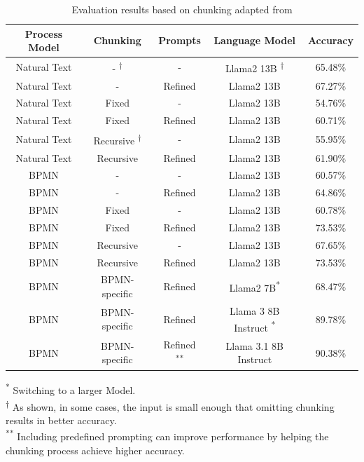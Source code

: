 \documentclass[%
    paper=A4,                    %
    twoside=true,               %
    openright,                  %
    parskip=full,               %
    chapterprefix=true,         %
    11pt,                       %
    headings=normal,            %
    bibliography=totoc,         %
    listof=totoc,              %
    titlepage=on,              %
    captions=tableabove,        %
    draft=false,               %
]{scrreprt}%
\begin{document}
     \begin{table}[H]
   	\centering
   	\begin{tabular}{|c|c|c|c| c|}
   		\hline
   		\rowcolor{blue!30}
   		Process Model & Chunking & Prompts & Language Model & Accuracy \\
   		\hline
   		Natural Text & - \textsuperscript{†}& - & Llama2 13B \textsuperscript{†} & \cellcolor{yellow!30}65.48\% \\
   		Natural Text & - & Refined 	 & Llama2 13B & 67.27\% \\
   		Natural Text & Fixed & - & Llama2 13B & 54.76\% \\
   		Natural Text & Fixed & Refined & Llama2 13B & 60.71\% \\
   		Natural Text & Recursive  \textsuperscript{†}& - & Llama2 13B &\cellcolor{yellow!30} 55.95\% \\
   		Natural Text & Recursive & Refined & Llama2 13B & 61.90\% \\
   		BPMN & - & - & Llama2 13B & 60.57\% \\
   		BPMN & - & Refined & Llama2 13B & 64.86\% \\
   		BPMN & Fixed & - & Llama2 13B & 60.78\% \\
   		BPMN & Fixed & Refined & Llama2 13B & 73.53\% \\
   		BPMN & Recursive & - & Llama2 13B & 67.65\% \\
   		BPMN & Recursive & Refined & Llama2 13B & 73.53\% \\
   		BPMN & BPMN-specific & Refined & Llama2 7B\textsuperscript{{\hypertarget{model}{*}}} & 68.47\% \\
   		BPMN & BPMN-specific & Refined & Llama 3 8B Instruct \textsuperscript{*} & 89.78\% \\
   		
   		BPMN & BPMN-specific & Refined  \textsuperscript{**}&  Llama 3.1 8B Instruct  & 90.38\% \\
   		\bottomrule
   	\end{tabular}
   	
   	\caption{Evaluation results based on chunking adapted from \cite{bernardi2024conversing}}
   	\label{chunking_table} %
   	
   	\begin{minipage}{0.9\textwidth}
   		\footnotesize
   		\textsuperscript{*} Switching to a larger Model. \\
   		\textsuperscript{†} As shown, in some cases, the input is small enough that omitting chunking results in better accuracy.\\
   		\textsuperscript{**} Including predefined prompting can improve performance by helping the chunking process achieve higher accuracy.
   		
   		
   	\end{minipage}
   \end{table}
\end{document}
